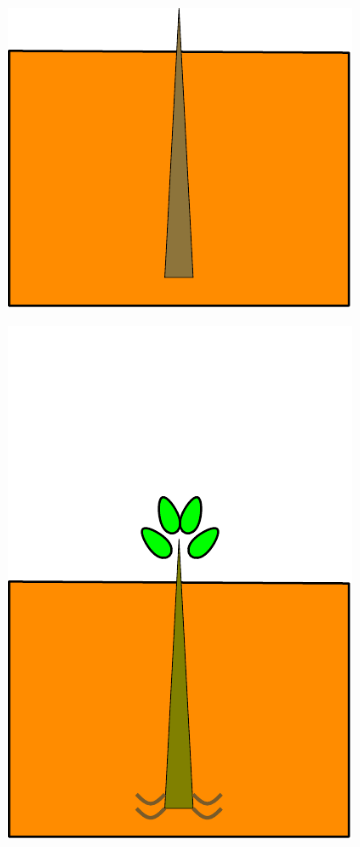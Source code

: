 \documentclass[10pt]{article}
\begin{document}
\begin{figure}%
\ifdefined\SHOWFIGS
\begin{subfigure}[b]{.1125\linewidth}
\centering
\includegraphics[width=1.0\linewidth]{img/tree_pics_1}
\caption{}  %
\label{fig:grow_1}
\end{subfigure}
\begin{subfigure}[b]{.1125\linewidth}
\centering
\includegraphics[width=1.0\linewidth]{img/tree_pics_2}

\end{subfigure}
\end{figure}
\end{document}
